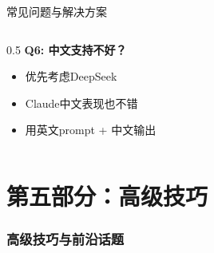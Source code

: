 \documentclass[aspectratio=169,11pt]{beamer}
\begin{document}
\begin{frame}{常见问题与解决方案}
\begin{columns}
\begin{column}{0.5\textwidth}
            \vspace{0.3cm}
            \textbf{Q6: 中文支持不好？}
            \begin{itemize}
                \item 优先考虑DeepSeek
                \item Claude中文表现也不错
                \item 用英文prompt + 中文输出
            \end{itemize}
        \end{column}
    \end{columns}
\end{frame}

\part{第五部分：高级技巧}

\section{高级技巧与前沿话题}
\end{document}
